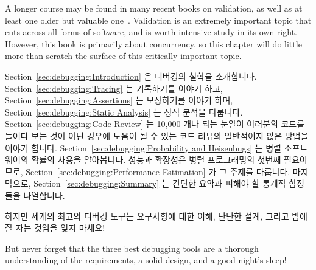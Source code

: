 A longer course may be found in many recent books on validation, as
well as at least one older but valuable
one~\cite{GlenfordJMyers1979}.
Validation is an extremely important topic that cuts across all forms
of software, and is worth intensive study in its own right.
However, this book is primarily about concurrency, so this chapter will do
little more than scratch the surface of this critically important topic.

\fi

Section~\ref{sec:debugging:Introduction}
은 디버깅의 철학을 소개합니다.
Section~\ref{sec:debugging:Tracing}
는 기록하기를 이야기 하고,
Section~\ref{sec:debugging:Assertions}
는 보장하기를 이야기 하며,
Section~\ref{sec:debugging:Static Analysis}
는 정적 분석을 다룹니다.
Section~\ref{sec:debugging:Code Review}
는 10,000 개나 되는 눈알이 여러분의 코드를 들여다 보는 것이 아닌 경우에 도움이
될 수 있는 코드 리뷰의 일반적이지 않은 방법을 이야기 합니다.
Section~\ref{sec:debugging:Probability and Heisenbugs}
는 병렬 소프트웨어의 확률의 사용을 알아봅니다.
성능과 확장성은 병렬 프로그래밍의 첫번째 필요이므로,
Section~\ref{sec:debugging:Performance Estimation} 가 그 주제를 다룹니다.
마지막으로,
Section~\ref{sec:debugging:Summary}
는 간단한 요약과 피해야 할 통계적 함정들을 나열합니다.

하지만 세개의 최고의 디버깅 도구는 요구사항에 대한 이해, 탄탄한 설계, 그리고
밤에 잘 자는 것임을 잊지 마세요!

\iffalse

But never forget that the three best debugging tools are a thorough
understanding of the requirements, a solid design, and a good night's
sleep!

